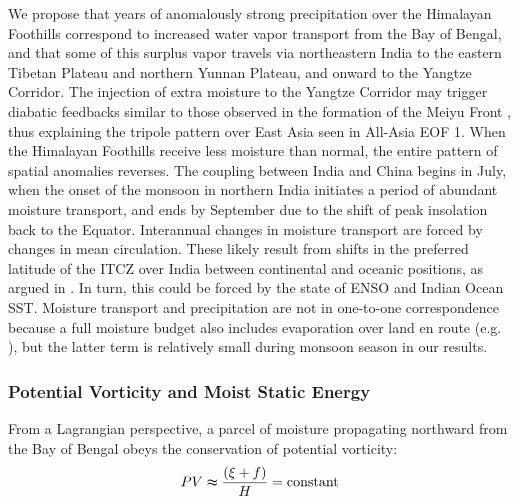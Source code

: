 \documentclass[12pt]{article}
\begin{document}
	We propose that years of anomalously strong precipitation over the Himalayan Foothills correspond to increased water vapor transport from the Bay of Bengal, and that some of this surplus vapor travels via northeastern India to the eastern Tibetan Plateau and northern Yunnan Plateau, and onward to the Yangtze Corridor. The injection of extra moisture to the Yangtze Corridor may trigger diabatic feedbacks similar to those observed in the formation of the Meiyu Front \citep{Sampe2010}, thus explaining the tripole pattern over East Asia seen in All-Asia EOF 1. When the Himalayan Foothills receive less moisture than normal, the entire pattern of spatial anomalies reverses. The coupling between India and China begins in July, when the onset of the monsoon in northern India initiates a period of abundant moisture transport, and ends by September due to the shift of peak insolation back to the Equator. Interannual changes in moisture transport are forced by changes in mean circulation. These likely result from shifts in the preferred latitude of the ITCZ over India between continental and oceanic positions, as argued in \cite{Gadgil2003}. In turn, this could be forced by the state of ENSO and Indian Ocean SST. Moisture transport and precipitation are not in one-to-one correspondence because a full moisture budget also includes evaporation over land en route (e.g. \cite{Chen2014b}), but the latter term is relatively small during monsoon season in our results.
		
\subsubsection{Potential Vorticity and Moist Static Energy}

	From a Lagrangian perspective, a parcel of moisture propagating northward from the Bay of Bengal obeys the conservation of potential vorticity:
	\begin{displaymath}
			PV  \thickapprox \frac{\left(\xi+f\right)}{H}  = \mathrm{ constant}
	\end{displaymath}
	
\end{document}
